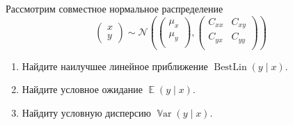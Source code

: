 \documentclass[12pt]{article}
\DeclareMathOperator{\Var}{\mathbb{V}ar}
\DeclareMathOperator{\BestLin}{BestLin}
\DeclareMathOperator{\E}{\mathbb{E}}
\newcommand{\cN}{\mathcal{N}}
\begin{document}
\begin{problem}
Рассмотрим совместное нормальное распределение 
\[
\begin{pmatrix}
    x \\
    y 
\end{pmatrix} \sim \cN\left(
\begin{pmatrix}
    \mu_x \\
    \mu_y \\
\end{pmatrix}, 
\begin{pmatrix}
    C_{xx} & C_{xy} \\
    C_{yx} & C_{yy} \\
\end{pmatrix}\right)
\]
\begin{enumerate}
    \item Найдите наилучшее линейное приближение $\BestLin(y \mid x)$.
    \item Найдите условное ожидание $\E(y \mid x)$.    
    \item Найдиту условную дисперсию $\Var(y \mid x)$.
\end{enumerate}


\end{problem}
\end{document}
